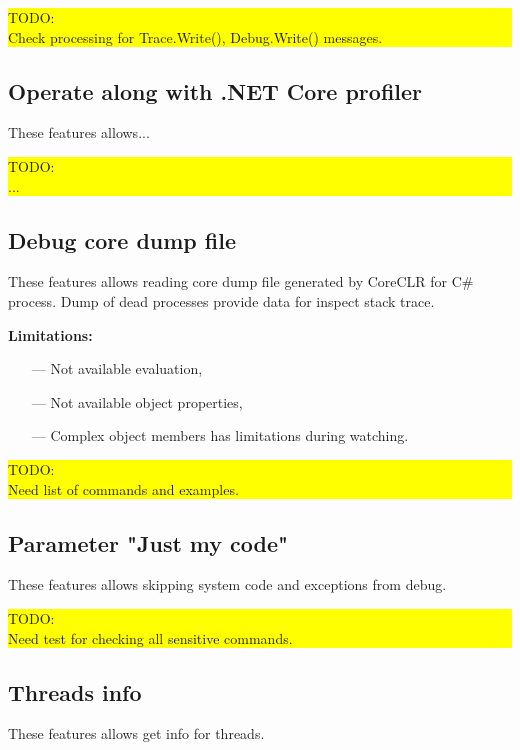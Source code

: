 \documentclass[a4paper,12pt]{article}
\begin{document}
\begin{frame}
{\bfseries\colorbox{yellow}{\parbox{12cm}{TODO: \\
Check processing for Trace.Write(), Debug.Write() messages.}}}
\end{frame}

\subsection{Operate along with .NET Core profiler}
These features allows...

\begin{frame}
{\bfseries\colorbox{yellow}{\parbox{12cm}{TODO: \\
...}}}
\end{frame}

\subsection{Debug core dump file}
These features allows reading core dump file generated by CoreCLR for C\# process. Dump of dead processes provide data for inspect stack trace.

\textbf{Limitations:}
\begin{itemize}
 \item[---] Not available evaluation,
 \item[---] Not available object properties,
 \item[---] Complex object members has limitations during watching.
\end{itemize}

\begin{frame}
{\bfseries\colorbox{yellow}{\parbox{12cm}{TODO: \\
Need list of commands and examples.}}}
\end{frame}

\subsection{Parameter "Just my code"}
These features allows skipping system code and exceptions from debug.

\begin{frame}{\bfseries\colorbox{yellow}{\parbox{12cm}{TODO: \\
Need test for checking all sensitive commands.}}}\end{frame}

\subsection{Threads info}
These features allows get info for threads.
\end{document}
